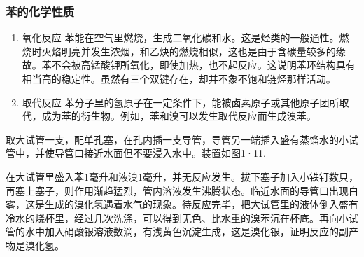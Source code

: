 \subsubsection{苯的化学性质}

\begin{enumerate}
\item
  氧化反应
  苯能在空气里燃烧，生成二氧化碳和水。这是烃类的一般通性。燃烧时火焰明亮并发生浓烟，和乙炔的燃烧相似，这也是由于含碳量较多的缘故。苯不会被高锰酸钾所氧化，即使加热，也不起反应。这说明苯环结构具有相当高的稳定性。虽然有三个双键存在，却并不象不饱和链烃那样活动。
\item
  取代反应
  苯分子里的氢原子在一定条件下，能被卤素原子或其他原子团所取代，成为苯的衍生物。例如，苯和溴可以发生取代反应而生成溴苯。
\end{enumerate}

取大试管一支，配单孔塞，在孔内插一支导管，导管另一端插入盛有蒸馏水的小试管中，并使导管口接近水面但不要浸入水中。装置如图1·11.

在大试管里盛入苯1毫升和液溴1毫升，并无反应发生。拔下塞子加入小铁钉数只，再塞上塞子，则作用渐趋猛烈，管内溶液发生沸腾状态。临近水面的导管口出现白雾，这是生成的溴化氢遇着水气的现象。待反应完毕，把大试管里的液体倒入盛有冷水的烧杯里，经过几次洗涤，可以得到无色、比水重的溴苯沉在杯底。再向小试管的水中加入硝酸银溶液数滴，有浅黄色沉淀生成，这是溴化银，证明反应的副产物是溴化氢。


